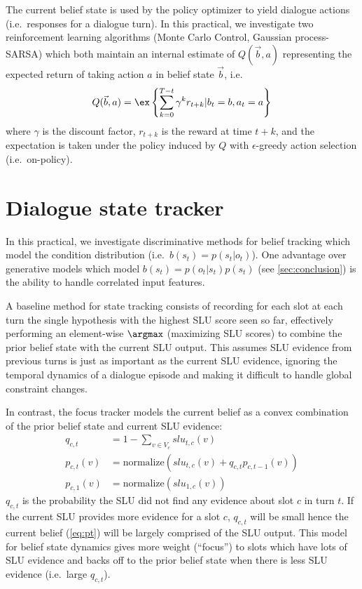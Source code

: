 \documentclass[a4paper,oneside,reqno]{amsart}
\begin{document}
The current belief state is used by the policy optimizer to yield dialogue
actions (i.e.\ responses for a dialogue turn). In this practical, we
investigate two reinforcement learning algorithms (Monte Carlo Control,
Gaussian process-SARSA) which both maintain an internal estimate of
$Q(\vec{b},a)$ representing the expected return of taking action $a$ in belief
state $\vec{b}$, i.e.
\begin{equation}
  \label{eq:Q}
  Q(\vec{b},a) = \ex\left\{ \sum_{k=0}^{T-t} \gamma^k r_{t+k} | b_t = b, a_t = a \right\}
\end{equation}
where $\gamma$ is the discount factor, $r_{t+k}$ is the reward at time $t+k$,
and the expectation is taken under the policy induced by $Q$ with $\epsilon$-greedy
action selection (i.e.\ on-policy).

\section{Dialogue state tracker}\label{sec:focus}

In this practical, we investigate discriminative methods for belief tracking
which model the condition distribution (i.e.\ $b(s_t) = p(s_t | o_t)$). One
advantage over generative models which model $b(s_t) = p(o_t|s_t) p(s_t)$ (see
\autoref{sec:conclusion}) is the ability to handle correlated input
features\cite{metallinou2013discriminative}.

A baseline method for state tracking consists of recording for each slot at
each turn the single hypothesis with the highest SLU score seen so far,
effectively performing an element-wise $\argmax$ (maximizing SLU scores) to
combine the prior belief state with the current SLU output. This assumes SLU
evidence from previous turns is just as important as the current SLU evidence,
ignoring the temporal dynamics of a dialogue episode and making it difficult to
handle global constraint changes.

In contrast, the focus tracker models the current belief as a convex combination
of the prior belief state and current SLU evidence:
\begin{align}
  q_{c,t} &= 1 - \sum_{v \in V_c} slu_{t,c}(v) \label{eq:q}\\
  p_{c,t}(v) &= \text{normalize}(slu_{t,c}(v) + q_{c,t} p_{c,t-1}(v)) \label{eq:pt}\\
  p_{c,1}(v) &= \text{normalize}(slu_{1,c}(v)) \label{eq:p0}
\end{align}
$q_{c,t}$ is the probability the SLU did not find any evidence about slot $c$
in turn $t$. If the current SLU provides more evidence for a slot $c$,
$q_{c,t}$ will be small hence the current belief (\autoref{eq:pt})
will be largely comprised of the SLU output. This model for belief state
dynamics gives more weight (``focus'') to slots which have lots of SLU evidence
and backs off to the prior belief state when there is
less SLU evidence (i.e.\ large $q_{c,t}$).
\end{document}
